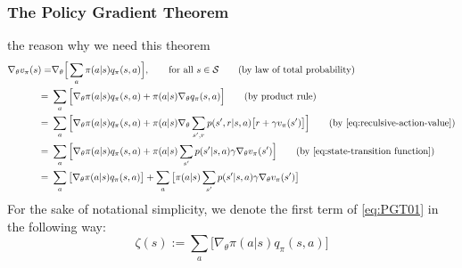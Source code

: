 \subsubsection{The Policy Gradient Theorem}
the reason why we need this theorem
\begin{align}
    \nabla_\theta v_\pi(s) =& \nabla_\theta\Big[ \sum_a\pi(a|s)q_\pi(s,a) \Big], \qquad \text{for all }s\in\mathcal{S} \tag{by law of total probability}\nonumber\\
    = \ & \sum_a\Big[ \nabla_\theta \pi(a|s)q_\pi(s,a) + \pi(a|s)\nabla_\theta q_\pi(s,a) \Big]\tag{by product rule}\nonumber\\
    = \ & \sum_a\Big[ \nabla_\theta \pi(a|s)q_\pi(s,a) + \pi(a|s)\nabla_\theta \sum_{s',r}p(s',r|s,a)\big[r+\gamma v_\pi(s')\big] \Big]\tag{by \autoref{eq:reculsive-action-value}}\nonumber\\
    = \ & \sum_a\Big[ \nabla_\theta \pi(a|s)q_\pi(s,a) + \pi(a|s) \sum_{s'} p(s'|s,a) \gamma \nabla_\theta v_\pi(s') \Big]\tag{by \autoref{eq:state-transition function}}\nonumber\\
    = \ & \sum_a\big[ \nabla_\theta \pi(a|s)q_\pi(s,a) \big] + \sum_a\big[\pi(a|s) \sum_{s'} p(s'|s,a) \gamma \nabla_\theta v_\pi(s') \big] \label{eq:PGT01}
\end{align}
For the sake of notational simplicity, we denote the first term of \eqref{eq:PGT01} in the following way:
$$\zeta(s):= \sum_a\big[ \nabla_\theta \pi(a|s)q_\pi(s,a) \big]$$
\clearpage

